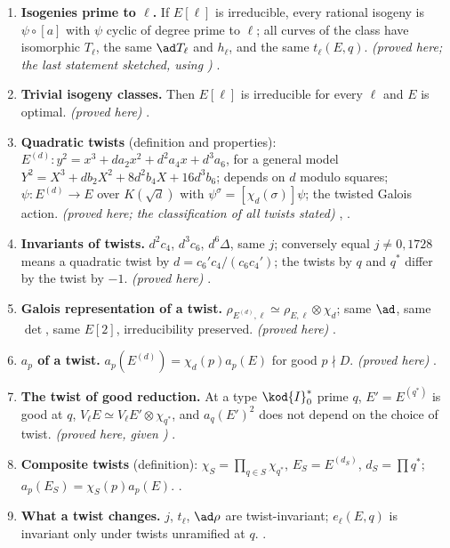 \begin{enumerate}[label=\textbf{\thechapter.\arabic*}]
\item \textbf{Isogenies prime to $\ell$.} If $E[\ell]$ is irreducible, every rational isogeny is $\psi\circ[a]$ with $\psi$ cyclic of degree prime to $\ell$; all curves of the class have isomorphic $T_\ell$, the same
$\ad T_\ell$ and $h_\ell$, and the same $t_\ell(E,q)$. \emph{(proved here; the last statement sketched, using )} .
\item \textbf{Trivial isogeny classes.} Then $E[\ell]$ is irreducible for every $\ell$ and $E$ is optimal. \emph{(proved here)} .
\item \textbf{Quadratic twists} (definition and properties): $E^{(d)}\colon y^2=x^3+da_2x^2+d^2a_4x+d^3a_6$, for a general model $Y^2=X^3+db_2X^2+8d^2b_4X+16d^3b_6$; depends on $d$ modulo squares;
$\psi\colon E^{(d)}\to E$ over $K(\sqrt d)$ with $\psi^\sigma=[\chi_d(\sigma)]\psi$; the twisted Galois action. \emph{(proved here; the classification of all twists stated)} ,
.
\item \textbf{Invariants of twists.} $d^2c_4$, $d^3c_6$, $d^6\Delta$, same $j$; conversely equal $j\ne0,1728$ means a quadratic twist by $d=c_6'c_4/(c_6c_4')$; the twists by $q$ and $q^*$ differ by the twist by $-1$.
\emph{(proved here)} .
\item \textbf{Galois representation of a twist.} $\rho_{E^{(d)},\ell}\simeq\rho_{E,\ell}\otimes\chi_d$; same $\ad$, same $\det$, same $E[2]$, irreducibility preserved. \emph{(proved here)} .
\item \textbf{$a_p$ of a twist.} $a_p(E^{(d)})=\chi_d(p)a_p(E)$ for good $p\nmid D$. \emph{(proved here)} .
\item \textbf{The twist of good reduction.} At a type $\kod{I}_0^*$ prime $q$, $E'=E^{(q^*)}$ is good at $q$, $V_\ell E\simeq V_\ell E'\otimes\chi_{q^*}$, and $a_q(E')^2$ does not depend on the choice of twist. \emph{(proved here,
given )} .
\item \textbf{Composite twists} (definition): $\chi_S=\prod_{q\in S}\chi_{q^*}$, $E_S=E^{(d_S)}$, $d_S=\prod q^*$; $a_p(E_S)=\chi_S(p)a_p(E)$. .
\item \textbf{What a twist changes.} $j$, $t_\ell$, $\ad\rho$ are twist-invariant; $e_\ell(E,q)$ is invariant only under twists unramified at $q$. .

\end{enumerate}
